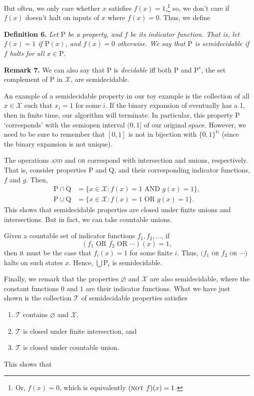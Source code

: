 \documentclass[10]{article}
\providecommand{\bbN}{\mathbb{N}}
\theoremstyle{plain}
\let\emptyset\varnothing
\providecommand{\OR}{\textsc{ or }}
\providecommand{\NOT}{\textsc{not }}
\begin{document}
But often, we only care whether $x$ satisfies $f(x) = 1$,\footnote{Or, $f(x) = 0$, which is equivalently $(\NOT f)(x) = 1$.} so, we don't care if $f(x)$ doesn't halt on inputs of $x$ where $f(x) = 0$. Thus, we define

\textbf{Definition 6.}
\emph{Let $\mathrm{P}$ be a property, and $f$ be its indicator function. That is, let $f(x) = 1$ if $\mathrm{P}(x)$, and $f(x) = 0$ otherwise. We say that $\mathrm{P}$ is \emph{semidecidable} if $f$ halts for all $x \in \mathrm{P}$. }

\textbf{Remark 7.}
We can also say that $\mathrm{P}$ is \emph{decidable} iff both $\mathrm{P}$ and $\mathrm{P}^c$, the set complement of $\mathrm{P}$ in $\mathcal{X}$, are semidecidable.


An example of a semidecidable property in our toy example is the collection of all $x \in \mathcal{X}$ such that $x_i = 1$ for some $i$. If the binary expansion of eventually has a 1, then in finite time, our algorithm will terminate. In particular, this property $\mathrm{P}$ `corresponds' with the semiopen interval $(0,1]$ of our original space. However, we need to be sure to remember that $[0,1]$ is not in bijection with $\{0,1\}^\bbN$ (since the binary expansion is not unique).

The operations \textsc{and} and \textsc{or} correspond with intersection and unions, respectively. That is, consider properties $\mathrm{P}$ and $\mathrm{Q}$, and their corresponding indicator functions, $f$ and $g$. Then, 
\begin{align*}
    \mathrm{P} \cap \mathrm{Q} &= \{x \in \mathcal{X}: f(x) = 1 \textrm{ AND } g(x) = 1\},\\
    \mathrm{P} \cup \mathrm{Q} &= \{ x\in \mathcal{X}: f(x) = 1 \textrm{ OR } g(x) = 1\}.
\end{align*}
This shows that semidecidable properties are closed under finite unions and intersections. But in fact, we can take countable unions. 

Given a countable set of indicator functions $f_1,f_2,\dotsc$, if 
\[(f_1 \textrm{ OR } f_2 \textrm{ OR } \dotsm)(x) = 1,\] 
then it must be the case that $f_i(x) = 1$ for some finite $i$. Thus, $(f_1$ \OR $f_2$ \OR $\dotsm)$ halts on such states $x$. Hence, $\bigcup \mathrm{P}_i$ is semidecidable.

Finally, we remark that the properties $\emptyset$ and $\mathcal{X}$ are also semidecidable, where the constant functions $0$ and $1$ are their indicator functions. What we have just shown is the collection $\mathcal{T}$ of semidecidable properties satisfies
\begin{enumerate}
    \item $\mathcal{T}$ contains $\emptyset$ and $\mathcal{X}$,
    \item $\mathcal{T}$ is closed under finite intersection, and
    \item $\mathcal{T}$ is closed under countable union.
\end{enumerate}
This shows that
\end{document}
